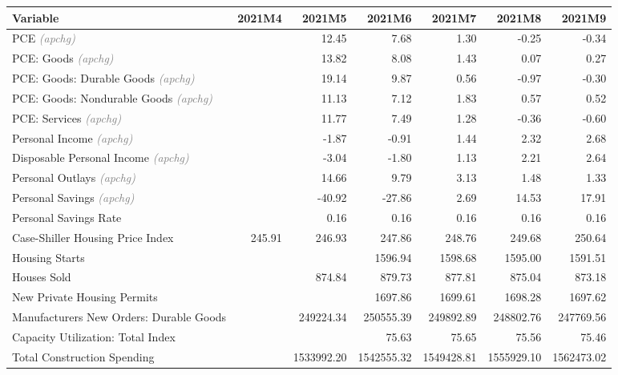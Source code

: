 \documentclass[11pt, letterpaper]{article}\usepackage[]{graphicx}\usepackage[]{color}
\begin{document}
\begin{table}[H]
\centering
\begingroup\fontsize{10pt}{12pt}\selectfont
\begin{tabular}{lrrrrrr}
  \hline
Variable & 2021M4 & 2021M5 & 2021M6 & 2021M7 & 2021M8 & 2021M9 \\ 
  \hline
PCE \textit{\footnotesize\textcolor{gray}{(apchg)}} &  & 12.45 & 7.68 & 1.30 & -0.25 & -0.34 \\ 
  PCE: Goods \textit{\footnotesize\textcolor{gray}{(apchg)}} &  & 13.82 & 8.08 & 1.43 & 0.07 & 0.27 \\ 
  PCE: Goods: Durable Goods \textit{\footnotesize\textcolor{gray}{(apchg)}} &  & 19.14 & 9.87 & 0.56 & -0.97 & -0.30 \\ 
  PCE: Goods: Nondurable Goods \textit{\footnotesize\textcolor{gray}{(apchg)}} &  & 11.13 & 7.12 & 1.83 & 0.57 & 0.52 \\ 
  PCE: Services \textit{\footnotesize\textcolor{gray}{(apchg)}} &  & 11.77 & 7.49 & 1.28 & -0.36 & -0.60 \\ 
  Personal Income \textit{\footnotesize\textcolor{gray}{(apchg)}} &  & -1.87 & -0.91 & 1.44 & 2.32 & 2.68 \\ 
  Disposable Personal Income \textit{\footnotesize\textcolor{gray}{(apchg)}} &  & -3.04 & -1.80 & 1.13 & 2.21 & 2.64 \\ 
  Personal Outlays \textit{\footnotesize\textcolor{gray}{(apchg)}} &  & 14.66 & 9.79 & 3.13 & 1.48 & 1.33 \\ 
  Personal Savings \textit{\footnotesize\textcolor{gray}{(apchg)}} &  & -40.92 & -27.86 & 2.69 & 14.53 & 17.91 \\ 
  Personal Savings Rate &  & 0.16 & 0.16 & 0.16 & 0.16 & 0.16 \\ 
  Case-Shiller Housing Price Index & 245.91 & 246.93 & 247.86 & 248.76 & 249.68 & 250.64 \\ 
  Housing Starts &  &  & 1596.94 & 1598.68 & 1595.00 & 1591.51 \\ 
  Houses Sold &  & 874.84 & 879.73 & 877.81 & 875.04 & 873.18 \\ 
  New Private Housing Permits &  &  & 1697.86 & 1699.61 & 1698.28 & 1697.62 \\ 
  Manufacturers New Orders: Durable Goods &  & 249224.34 & 250555.39 & 249892.89 & 248802.76 & 247769.56 \\ 
  Capacity Utilization: Total Index &  &  & 75.63 & 75.65 & 75.56 & 75.46 \\ 
  Total Construction Spending &  & 1533992.20 & 1542555.32 & 1549428.81 & 1555929.10 & 1562473.02 \\ 

\end{tabular}
\end{table}
\end{document}
